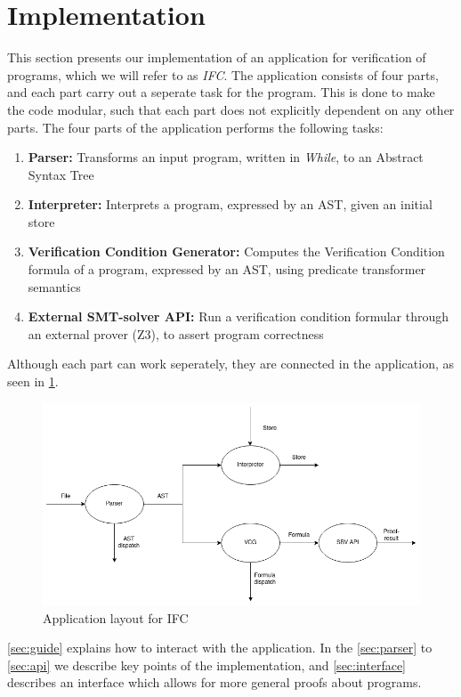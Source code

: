 \section{Implementation}\label{sec:implementation}
This section presents our implementation of an application for verification of programs, which we will refer to as \textit{IFC}.
The application consists of four parts, and each part carry out a seperate task for the program. 
This is done to make the code modular, such that each part does not explicitly dependent on any other parts. 
The four parts of the application performs the following tasks:
\begin{enumerate}
  \item \textbf{Parser:} Transforms an input program, written in \textit{While}, to an Abstract Syntax Tree
  \item \textbf{Interpreter:} Interprets a program, expressed by an AST, given an initial store
  \item \textbf{Verification Condition Generator:} Computes the Verification Condition formula of a program, expressed by an AST, using predicate transformer semantics
  \item \textbf{External SMT-solver API:} Run a verification condition formular through an external prover (Z3), to assert program correctness
\end{enumerate}
Although each part can work seperately, they are connected in the application, as seen in \cref{fig:flow}.

\begin{figure}[h]
  \includegraphics[width=\linewidth]{Implementation/IFCapp.png}
  \caption{Application layout for IFC}
  \label{fig:flow}
\end{figure}

\cref{sec:guide} explains how to interact with the application. In the \cref{sec:parser} to \cref{sec:api} we describe key points of the implementation, and \cref{sec:interface} describes an interface which allows for more general proofs about programs.










